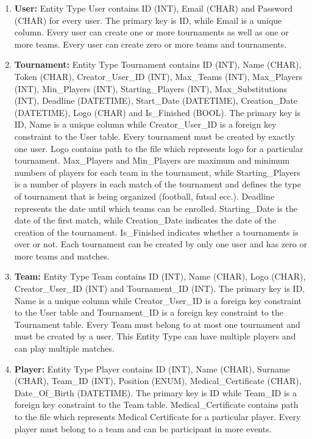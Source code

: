 \begin{enumerate}
    \item \textbf{User:} Entity Type User contains ID (INT), Email (CHAR) and Password (CHAR) for every user. The primary key is ID, while Email is a unique column. Every user can create one or more tournaments as well as one or more teams. Every user can create zero or more teams and tournaments.
    
    \item \textbf{Tournament:} Entity Type Tournament contains ID (INT), Name (CHAR), Token (CHAR), Creator\_User\_ID (INT), Max\_Teams (INT), Max\_Players (INT), Min\_Players (INT), Starting\_Players (INT), Max\_Substitutions (INT), Deadline (DATETIME), Start\_Date (DATETIME), Creation\_Date (DATETIME), Logo (CHAR) and Is\_Finished (BOOL). The primary key is ID, Name is a unique column while Creator\_User\_ID is a foreign key constraint to the User table. Every tournament must be created by exactly one user. Logo contains path to the file which represents logo for a particular tournament. Max\_Players and Min\_Players are maximum and minimum numbers of players for each team in the tournament, while Starting\_Players is a number of players in each match of the tournament and defines the type of tournament that is being organized (football, futsal ecc.). Deadline represents the date until which teams can be enrolled. Starting\_Date is the date of the first match, while Creation\_Date indicates the date of the creation of the tournament. Is\_Finished indicates whether a tournaments is over or not. Each tournament can be created by only one user and has zero or more teams and matches.
    
    \item \textbf{Team:} Entity Type Team contains ID (INT), Name (CHAR), Logo (CHAR), Creator\_User\_ID (INT) and Tournament\_ID (INT). The primary key is ID, Name is a unique column while Creator\_User\_ID is a foreign key constraint to the User table and Tournament\_ID is a foreign key constraint to the Tournament table. Every Team must belong to at most one tournament and must be created by a user. This Entity Type can have multiple players and can play multiple matches. 

    \item \textbf{Player:} Entity Type Player contains ID (INT), Name (CHAR), Surname (CHAR), Team\_ID (INT), Position (ENUM), Medical\_Certificate (CHAR), Date\_Of\_Birth (DATETIME). The primary key is ID while Team\_ID is a foreign key constraint to the Team table.  Medical\_Certificate contains path to the file which represents Medical Certificate for a particular player. Every player must belong to a team and can be participant in more events.


\end{enumerate}

